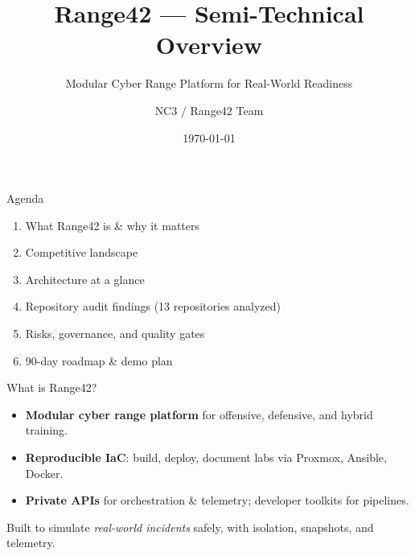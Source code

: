 \documentclass[aspectratio=169]{beamer}
\title{\faIcon{shield-alt}\; Range42 — Semi-Technical Overview}
\subtitle{Modular Cyber Range Platform for Real-World Readiness}
\author{NC3 / Range42 Team}
\date{\today}
\institute{\faServer\; Proxmox \quad \faCogs\; Ansible \quad \faProjectDiagram\; Orchestration \quad \faBinoculars\; Telemetry}
\begin{document}
\begin{frame}
  \titlepage
\end{frame}

\begin{frame}{Agenda}
  \begin{enumerate}
    \item What Range42 is \& why it matters
    \item Competitive landscape
    \item Architecture at a glance
    \item Repository audit findings (13 repositories analyzed)
    \item Risks, governance, and quality gates
    \item 90-day roadmap \& demo plan
  \end{enumerate}
\end{frame}

\begin{frame}{What is Range42?}
  \begin{itemize}
    \item \textbf{Modular cyber range platform} for offensive, defensive, and hybrid training.
    \item \textbf{Reproducible IaC}: build, deploy, document labs via Proxmox, Ansible, Docker.
    \item \textbf{Private APIs} for orchestration \& telemetry; developer toolkits for pipelines.
  \end{itemize}
  \begin{tcolorbox}
    \faInfoCircle\; Built to simulate \emph{real-world incidents} safely, with isolation, snapshots, and telemetry.
  \end{tcolorbox}
\end{frame}
\end{document}
